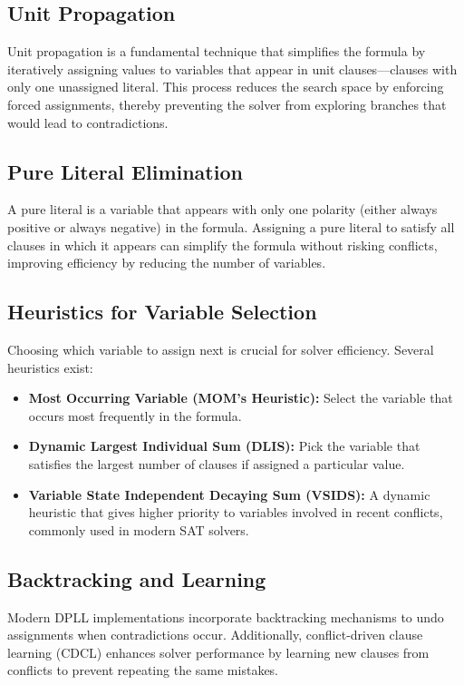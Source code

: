 \documentclass{article}
\begin{document}
\subsection{Unit Propagation}
Unit propagation is a fundamental technique that simplifies the formula by iteratively assigning values to variables that appear in unit clauses—clauses with only one unassigned literal. This process reduces the search space by enforcing forced assignments, thereby preventing the solver from exploring branches that would lead to contradictions.

\subsection{Pure Literal Elimination}
A pure literal is a variable that appears with only one polarity (either always positive or always negative) in the formula. Assigning a pure literal to satisfy all clauses in which it appears can simplify the formula without risking conflicts, improving efficiency by reducing the number of variables.

\subsection{Heuristics for Variable Selection}
Choosing which variable to assign next is crucial for solver efficiency. Several heuristics exist:

\begin{itemize}
    \item \textbf{Most Occurring Variable (MOM's Heuristic):} Select the variable that occurs most frequently in the formula.
    \item \textbf{Dynamic Largest Individual Sum (DLIS):} Pick the variable that satisfies the largest number of clauses if assigned a particular value.
    \item \textbf{Variable State Independent Decaying Sum (VSIDS):} A dynamic heuristic that gives higher priority to variables involved in recent conflicts, commonly used in modern SAT solvers.
\end{itemize}

\subsection{Backtracking and Learning}
Modern DPLL implementations incorporate backtracking mechanisms to undo assignments when contradictions occur. Additionally, conflict-driven clause learning (CDCL) enhances solver performance by learning new clauses from conflicts to prevent repeating the same mistakes.
\end{document}
